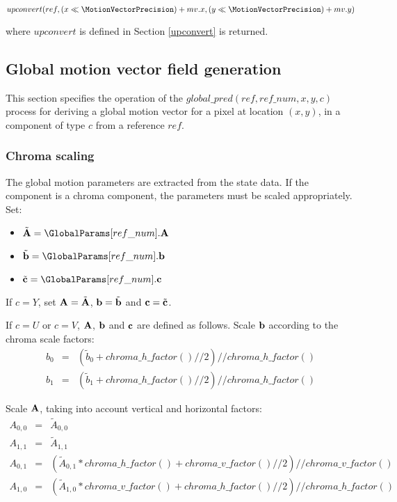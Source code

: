 $upconvert(ref, (x\ll \MotionVectorPrecision)+mv.x, (y\ll \MotionVectorPrecision)+mv.y)$ 

where $upconvert$ is defined in Section \ref{upconvert} is returned.
 
\subsection{Global motion vector field generation}
\label{globalmv}

This section specifies the operation of the $global\_pred(ref, ref\_num, x,y, c)$ process
for deriving a global motion vector for a pixel at location $(x,y)$, in a component of 
type $c$ from a reference $ref$.

\subsubsection{Chroma scaling}
\label{chromascaling}

The global motion parameters are extracted from the state data. If the component is a chroma
component, the parameters must be scaled appropriately. Set:

\begin{itemize}
\item $\tilde{\bf A}=\GlobalParams[ref\_num].{\bf A}$
\item $\tilde{\bf b}=\GlobalParams[ref\_num].{\bf b}$
\item $\tilde{\bf c}=\GlobalParams[ref\_num].{\bf c}$
\end{itemize}

If $c=Y$, set ${\bf A}=\tilde{\bf A}$, ${\bf b}=\tilde{\bf b}$ and ${\bf c}=\tilde{\bf c}$.

If $c=U$ or $c=V$, ${\bf A}$, ${\bf b}$ and ${\bf c}$ are defined as follows. Scale 
${\bf b}$ according to the chroma scale factors:
\begin{eqnarray*}
b_0 & = & \left(\tilde{b}_0+chroma\_h\_factor()//2\right)//chroma\_h\_factor() \\
b_1 & = & \left(\tilde{b}_1+chroma\_h\_factor()//2\right)//chroma\_h\_factor()
\end{eqnarray*}

Scale ${\bf A}$, taking into account vertical and horizontal factors:
\begin{eqnarray*}
A_{0,0} & = & \tilde{A}_{0,0}\\
A_{1,1} & = & \tilde{A}_{1,1}\\
A_{0,1} & = & \left(\tilde{A}_{0,1}*chroma\_h\_factor()+chroma\_v\_factor()//2 \right) // chroma\_v\_factor() \\
A_{1,0} & = & \left(\tilde{A}_{1,0}*chroma\_v\_factor()+chroma\_h\_factor()//2\right)//chroma\_h\_factor()
\end{eqnarray*}

